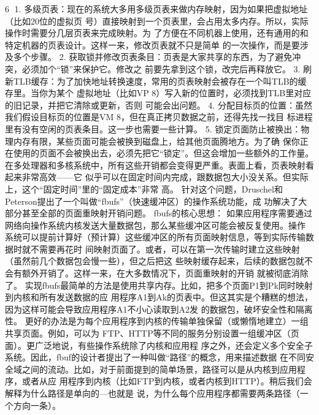                                                       6
1.   多级页表：现在的系统大多用多级页表来做内存映射，因为如果把虚拟地址（比如20位的虚拟页
     号）直接映射到一个页表里，会占用太多内存。所以，实际操作时需要分几层页表来完成映射。为
     了方便在不同机器上使用，还有通用的和特定机器的页表设计。这样一来，修改页表就不只是简单
     的一次操作，而是要涉及多个步骤。
  2. 获取锁并修改页表条目：页表是大家共享的东西，为了避免冲突，必须加个“锁”来保护它。修改之
     前要先拿到这个锁，改完后再释放它。
  3. 刷新TLB缓存：为了加快地址转换速度，常用的页表映射会被存在一个叫TLB的缓存里。当你为某个
     虚拟地址（比如VP 8）写入新的位置时，必须找到TLB里对应的旧记录，并把它清除或更新，否则
     可能会出问题。
  4. 分配目标页的位置：虽然我们假设目标页的位置是VM 8，但在真正拷贝数据之前，还得先找一找目
     标进程里有没有空闲的页表条目。这一步也需要一些计算。
  5. 锁定页面防止被换出：物理内存有限，某些页面可能会被换到磁盘上，给其他页面腾地方。为了确
     保你正在使用的页面不会被换出去，必须先把它“锁定”。但这会增加一些额外的工作量。
在多处理器和多核系统中，所有这些开销都会变得更严重。表面上看，页表映射看起来非常高效——它
似乎可以在固定时间内完成，跟数据包大小没关系。但实际上，这个“固定时间”里的“固定成本”非常
高。 针对这个问题，Druschel和Peterson提出了一个叫做“fbufs”（快速缓冲区）的操作系统功能，成
功解决了大部分甚至全部的页面重映射开销问题。
fbufs的核心思想：
如果应用程序需要通过网络向操作系统内核发送大量数据包，那么某些缓冲区可能会被反复使用。操作
系统可以提前计算好（预计算）这些缓冲区的所有页面映射信息，等到实际传输数据时就不需要再花时
间映射页面了。或者，可以在第一次传输时建立这些映射（虽然前几个数据包会慢一些），但之后把这
些映射缓存起来，后续的数据包就不会有额外开销了。这样一来，在大多数情况下，页面重映射的开销
就被彻底消除了。
实现fbufs最简单的方法是使用共享内存。比如，把多个页面P1到Pk同时映射到内核和所有发送数据的应
用程序A1到Ak的页表中。但这其实是个糟糕的想法，因为这样可能会导致应用程序A1不小心读取到A2发
的数据包，破坏安全性和隔离性。
更好的办法是为每个应用程序到内核的传输单独保留（或懒惰地建立）一组共享页面。例如，可以为
FTP、HTTP等不同的服务分别设置一组缓冲区（页面）。更广泛地说，有些操作系统除了内核和应用程
序之外，还会定义多个安全子系统。因此，fbuf的设计者提出了一种叫做“路径”的概念，用来描述数据
在不同安全域之间的流动。比如，对于前面提到的简单场景，路径可以是从内核到应用程序，或者从应
用程序到内核（比如FTP到内核，或者内核到HTTP）。稍后我们会解释为什么路径是单向的—也就是
说，为什么每个应用程序都需要两条路径（一个方向一条）。




